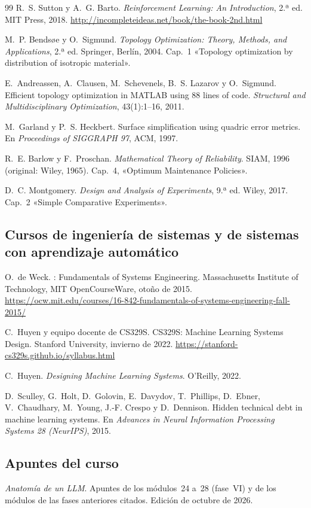 \begin{thebibliography}{99}
R.~S. Sutton y A.~G. Barto.
\newblock \emph{Reinforcement Learning: An Introduction}, 2.ª ed.
\newblock MIT Press, 2018.
\newblock \url{http://incompleteideas.net/book/the-book-2nd.html}

M.~P. Bendsøe y O.~Sigmund.
\newblock \emph{Topology Optimization: Theory, Methods, and Applications}, 2.ª ed.
\newblock Springer, Berlín, 2004. Cap.~1 «Topology optimization by distribution of isotropic material».

E.~Andreassen, A.~Clausen, M.~Schevenels, B.~S. Lazarov y O.~Sigmund.
\newblock Efficient topology optimization in MATLAB using 88 lines of code.
\newblock \emph{Structural and Multidisciplinary Optimization}, 43(1):1--16, 2011.

M.~Garland y P.~S. Heckbert.
\newblock Surface simplification using quadric error metrics.
\newblock En \emph{Proceedings of SIGGRAPH 97}, ACM, 1997.

R.~E. Barlow y F.~Proschan.
\newblock \emph{Mathematical Theory of Reliability}.
\newblock SIAM, 1996 (original: Wiley, 1965). Cap.~4, «Optimum Maintenance Policies».

D.~C. Montgomery.
\newblock \emph{Design and Analysis of Experiments}, 9.ª ed.
\newblock Wiley, 2017. Cap.~2 «Simple Comparative Experiments».

\subsection*{Cursos de ingeniería de sistemas y de sistemas con aprendizaje automático}

O.~de Weck.
: Fundamentals of Systems Engineering.
\newblock Massachusetts Institute of Technology, MIT OpenCourseWare, otoño de 2015.
\newblock \url{https://ocw.mit.edu/courses/16-842-fundamentals-of-systems-engineering-fall-2015/}

C.~Huyen y equipo docente de CS329S.
\newblock CS329S: Machine Learning Systems Design.
\newblock Stanford University, invierno de 2022.
\newblock \url{https://stanford-cs329s.github.io/syllabus.html}

C.~Huyen.
\newblock \emph{Designing Machine Learning Systems}.
\newblock O'Reilly, 2022.

D.~Sculley, G.~Holt, D.~Golovin, E.~Davydov, T.~Phillips, D.~Ebner, V.~Chaudhary, M.~Young, J.-F. Crespo y D.~Dennison.
\newblock Hidden technical debt in machine learning systems.
\newblock En \emph{Advances in Neural Information Processing Systems 28 (NeurIPS)}, 2015.

\subsection*{Apuntes del curso}

\emph{Anatomía de un LLM}. Apuntes de los módulos~24 a~28 (fase~VI) y de los módulos de las fases anteriores citados.
\newblock Edición de octubre de 2026.

\end{thebibliography}
